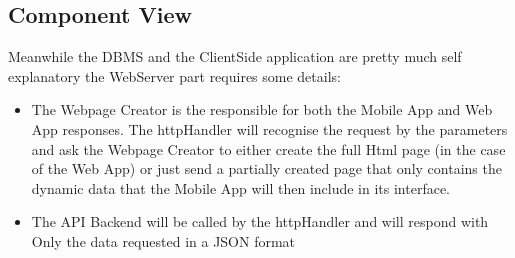 \documentclass{article}
\begin{document}
\subsection{Component View}
\begin{figure}[H]
\end{figure}
	  Meanwhile the DBMS and the ClientSide application are pretty much self explanatory the WebServer part requires some details:
	  \begin{itemize}
			  \item The Webpage Creator is the responsible for both the Mobile App and Web App responses. The httpHandler will recognise the request by the parameters and ask the Webpage Creator to either create the full Html page (in the case of the Web App) or just send a partially created page that only contains the dynamic data that the Mobile App will then include in its interface.
			  \item The API Backend will be called by the httpHandler and will respond with Only the data requested in a JSON format
	  \end{itemize}
\end{document}
